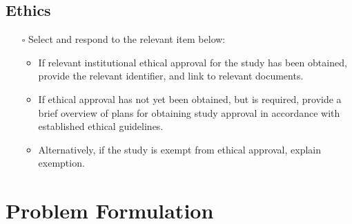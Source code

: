 \documentclass[
]{article}
\providecommand{\tightlist}{%
  \setlength{\itemsep}{0pt}\setlength{\parskip}{0pt}}\usepackage{longtable,booktabs,array}
\begin{document}
\subsection*{Ethics}\label{ethics}

\begin{tcolorbox}[enhanced jigsaw, opacityback=0, left=2mm, opacitybacktitle=0.6, breakable, toptitle=1mm, rightrule=.15mm, titlerule=0mm, leftrule=.75mm, title=\textcolor{quarto-callout-caution-color}{\faFire}\hspace{0.5em}{Preregistration Item}, colback=white, arc=.35mm, bottomtitle=1mm, bottomrule=.15mm, colframe=quarto-callout-caution-color-frame, coltitle=black, colbacktitle=quarto-callout-caution-color!10!white, toprule=.15mm]

\begin{itemize}
\tightlist
\item[$\square$]
  Select and respond to the relevant item below:

  \begin{itemize}
  \tightlist
  \item
    If relevant institutional ethical approval for the study has been
    obtained, provide the relevant identifier, and link to relevant
    documents.
  \item
    If ethical approval has not yet been obtained, but is required,
    provide a brief overview of plans for obtaining study approval in
    accordance with established ethical guidelines.
  \item
    Alternatively, if the study is exempt from ethical approval, explain
    exemption.
  \end{itemize}
\end{itemize}

\end{tcolorbox}

\section{Problem Formulation}\label{sec-problem-formulation}
\end{document}

